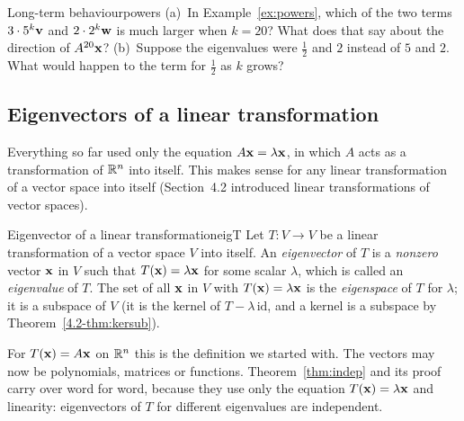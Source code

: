 \documentclass[11pt]{article}
\begin{document}
\begin{think}{Long-term behaviour}{powers}
(a)~In Example~\ref{ex:powers}, which of the two terms $3\cdot5^k\mathbf{v}$ and $2\cdot2^k\mathbf{w}$ is much larger when $k=20$? What does that say about the direction of $A^{20}\mathbf{x}$? (b)~Suppose the eigenvalues were $\tfrac12$ and $2$ instead of $5$ and $2$. What would happen to the term for $\tfrac12$ as $k$ grows?
\end{think}

\subsection*{Eigenvectors of a linear transformation}

Everything so far used only the equation $A\mathbf{x}=\lambda\mathbf{x}$, in which $A$ acts as a transformation of $\mathbb{R}^n$ into itself. This makes sense for any linear transformation of a vector space into itself (Section~4.2 introduced linear transformations of vector spaces).

\begin{defn}{Eigenvector of a linear transformation}{eigT}
Let $T:V\to V$ be a linear transformation of a vector space $V$ into itself. An \emph{eigenvector} of $T$ is a \emph{nonzero} vector $\mathbf{x}$ in $V$ such that $T(\mathbf{x})=\lambda\mathbf{x}$ for some scalar $\lambda$, which is called an \emph{eigenvalue} of $T$. The set of all $\mathbf{x}$ in $V$ with $T(\mathbf{x})=\lambda\mathbf{x}$ is the \emph{eigenspace} of $T$ for $\lambda$; it is a subspace of $V$ (it is the kernel of $T-\lambda\,\mathrm{id}$, and a kernel is a subspace by Theorem~\ref{4.2-thm:kersub}).
\end{defn}

For $T(\mathbf{x})=A\mathbf{x}$ on $\mathbb{R}^n$ this is the definition we started with. The vectors may now be polynomials, matrices or functions. Theorem~\ref{thm:indep} and its proof carry over word for word, because they use only the equation $T(\mathbf{x})=\lambda\mathbf{x}$ and linearity: eigenvectors of $T$ for different eigenvalues are independent.
\end{document}
